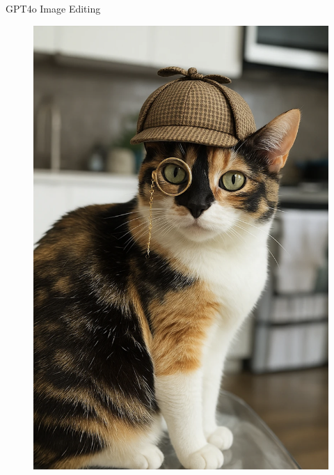 \documentclass{beamer}
\begin{document}
\begin{frame}{GPT4o Image Editing}
\begin{minipage}[t]{0.45\columnwidth}
\begin{figure}
			\includegraphics[width=0.93\linewidth]{figs/gpt4o_editing2}
		\end{figure}
	\end{minipage}
\end{frame}
\end{document}
